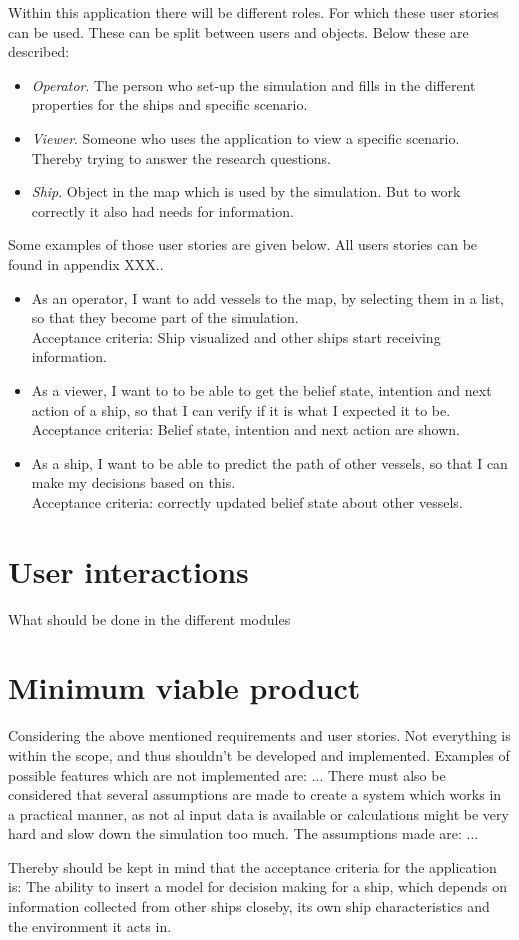 Within this application there will be different roles. For which these user stories can be used. These can be split between users and objects. Below these are described:
\begin{itemize}
	\item \emph{Operator}. The person who set-up the simulation and fills in the different properties for the ships and specific scenario.
	\item \emph{Viewer}. Someone who uses the application to view a specific scenario. Thereby trying to answer the research questions.
	\item \emph{Ship}. Object in the map which is used by the simulation. But to work correctly it also had needs for information.
\end{itemize}

Some examples of those user stories are given below. All users stories can be found in appendix XXX.. 

\begin{itemize}
	\item As an operator, I want to add vessels to the map, by selecting them in a list, so that they become part of the simulation. \\
	Acceptance criteria: Ship visualized and other ships start receiving information.
	\item As a viewer, I want to to be able to get the belief state, intention and next action of a ship, so that I can verify if it is what I expected it to be. \\
	Acceptance criteria: Belief state, intention and next action are shown.
	\item As a ship, I want to be able to predict the path of other vessels, so that I can make my decisions based on this. \\
	Acceptance criteria: correctly updated belief state about other vessels.
\end{itemize}

\section{User interactions}
What should be done in the different modules

\section{Minimum viable product}
Considering the above mentioned requirements and user stories. Not everything is within the scope, and thus shouldn't be developed and implemented. Examples of possible features which are not implemented are: ... 
There must also be considered that several assumptions are made to create a system which works in a practical manner, as not al input data is available or calculations might be very hard and slow down the simulation too much. The assumptions made are: ...

Thereby should be kept in mind that the acceptance criteria for the application is: The ability to insert a model for decision making for a ship, which depends on information collected from other ships closeby, its own ship characteristics and the environment it acts in.
